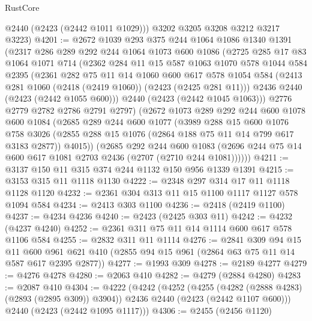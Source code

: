 \begin{lexlean}{RustCore}
\begin{coremodule}
        @2440
        (@2423 (@2442 @1011 @1029)))
      @3202
      @3205
      @3208
      @3212
      @3217
      @3223)
@4201 := @2672
    @1039
    @293
    @375
    @244
    @1064
    @1086
    @1340
    @1391
    (@2317
      @286
      @289
      @292
      @244
      @1064
      @1073
      @600
      @1086
      (@2725
        @285
        @17
        @83
        @1064
        @1071
        @714
        (@2362
          @284
          @11
          @15
          @587
          @1063
          @1070
          @578
          @1044
          @584
          @2395
          (@2361
            @282
            @75
            @11
            @14
            @1060
            @600
            @617
            @578
            @1054
            @584
            (@2413 @281 @1060 (@2418 (@2419 @1060)) (@2423 (@2425 @281 @11)))
            @2436
            @2440
            (@2423 (@2442 @1055 @600)))
          @2440
          (@2423 (@2442 @1045 @1063)))
        @2776
        @2779
        @2782
        @2786
        @2791
        @2797)
      (@2672
        @1073
        @289
        @292
        @244
        @600
        @1078
        @600
        @1084
        (@2685
          @289
          @244
          @600
          @1077
          (@3989
            @288
            @15
            @600
            @1076
            @758
            @3026
            (@2855 @288 @15 @1076 (@2864 @188 @75 @11 @14 @799 @617 @3183 @2877))
            @4015))
        (@2685
          @292
          @244
          @600
          @1083
          (@2696 @244 @75 @14 @600 @617 @1081 @2703 @2436 (@2707 (@2710 @244 @1081))))))
@4211 := @3137 @150 @11 @315 @374 @244 @1132 @150 @956 @1339 @1391
@4215 := @3153 @315 @11 @1118 @1130
@4222 := @2348 @297 @314 @17 @11 @1118 @1128 @1120
@4232 := @2361 @304 @313 @11 @15 @1100 @1117 @1127 @578 @1094 @584
@4234 := @2413 @303 @1100
@4236 := @2418 (@2419 @1100)
@4237 := @4234 @4236
@4240 := @2423 (@2425 @303 @11)
@4242 := @4232 (@4237 @4240)
@4252 := @2361 @311 @75 @11 @14 @1114 @600 @617 @578 @1106 @584
@4255 := @2832 @311 @11 @1114
@4276 := @2841
    @309
    @94
    @15
    @11
    @600
    @961
    @621
    @410
    (@2855 @94 @15 @961 (@2864 @63 @75 @11 @14 @587 @617 @2395 @2877))
@4277 := @1993 @309
@4278 := @2189 @4277
@4279 := @4276 @4278
@4280 := @2063 @410
@4282 := @4279 (@2884 @4280)
@4283 := @2087 @410
@4304 := @4222
    (@4242
      (@4252
        (@4255 (@4282 (@2888 @4283) (@2893 (@2895 @309)) @3904))
        @2436
        @2440
        (@2423 (@2442 @1107 @600)))
      @2440
      (@2423 (@2442 @1095 @1117)))
@4306 := @2455 (@2456 @1120)

\end{coremodule}
\end{lexlean}
